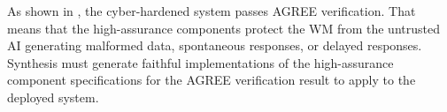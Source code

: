 As shown in , the cyber-hardened
system passes AGREE verification.  That means that the high-assurance
components protect the WM from the untrusted AI generating malformed
data, spontaneous responses, or delayed responses.  Synthesis must
generate faithful implementations of the high-assurance component
specifications for the AGREE verification result to apply to the
deployed system.

